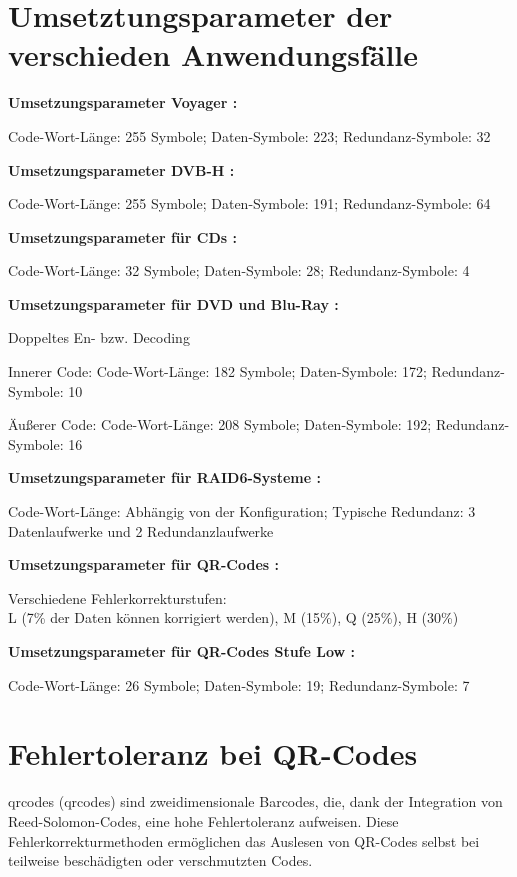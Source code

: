 \section{Umsetztungsparameter der verschieden Anwendungsfälle}\label{app:parameter}

\textbf{Umsetzungsparameter Voyager \cite{ludwigVoyagerTelecommunications2002}:}

Code-Wort-Länge: 255 Symbole;
Daten-Symbole: 223;
Redundanz-Symbole: 32

\textbf{Umsetzungsparameter DVB-H \cite{DVBH2024}:}

Code-Wort-Länge: 255 Symbole;
Daten-Symbole: 191;
Redundanz-Symbole: 64

\textbf{Umsetzungsparameter für CDs \cite{wickerReedSolomonCodes1994}:}
\nopagebreak

Code-Wort-Länge: 32 Symbole;
Daten-Symbole: 28;
Redundanz-Symbole: 4

\textbf{Umsetzungsparameter für DVD und Blu-Ray \cite{changReedSolomonProductCodeRSPC1998}:}

Doppeltes En- bzw. Decoding

Innerer Code:
Code-Wort-Länge: 182 Symbole;
Daten-Symbole: 172;
Redundanz-Symbole: 10

Äußerer Code:
Code-Wort-Länge: 208 Symbole;
Daten-Symbole: 192;
Redundanz-Symbole: 16

\textbf{Umsetzungsparameter für RAID6-Systeme \cite{RAIDStorageTechnology2021}:}

Code-Wort-Länge: Abhängig von der Konfiguration;
Typische Redundanz: 3 Datenlaufwerke und 2 Redundanzlaufwerke

\textbf{Umsetzungsparameter für QR-Codes \cite{QRCode2024}:}

Verschiedene Fehlerkorrekturstufen: \\ L (7\% der Daten können korrigiert werden), M (15\%), Q (25\%), H (30\%)

\textbf{Umsetzungsparameter für QR-Codes Stufe Low \cite{QRCode2024}:}

Code-Wort-Länge: 26 Symbole;
Daten-Symbole: 19;
Redundanz-Symbole: 7

\section{Fehlertoleranz bei QR-Codes}\label{app:qr-code}

\acrlong{qrcode}s (\acrshort{qrcode}s) sind zweidimensionale Barcodes, die, dank der Integration von Reed-Solomon-Codes, eine hohe Fehlertoleranz aufweisen.
Diese Fehlerkorrekturmethoden ermöglichen das Auslesen von QR-Codes selbst bei teilweise beschädigten oder verschmutzten Codes. 

